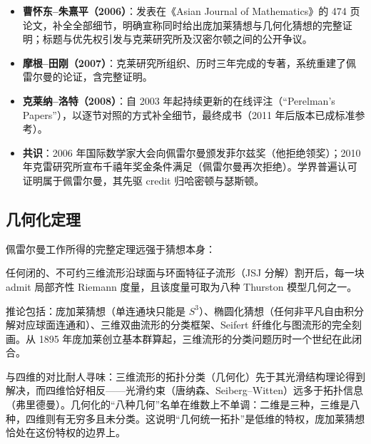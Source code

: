 \begin{itemize}
    \item \textbf{曹怀东--朱熹平（2006）}\cite{cao2006}：发表在《Asian Journal of Mathematics》的 474 页论文，补全全部细节，明确宣称同时给出庞加莱猜想与几何化猜想的完整证明；标题与优先权引发与克莱研究所及汉密尔顿之间的公开争议。
    \item \textbf{摩根--田刚（2007）}\cite{morgan2007}：克莱研究所组织、历时三年完成的专著，系统重建了佩雷尔曼的论证，含完整证明。
    \item \textbf{克莱纳--洛特（2008）}\cite{kleiner2008}：自 2003 年起持续更新的在线评注（“Perelman's Papers”），以逐节对照的方式补全细节，最终成书（2011 年后版本已成标准参考）。
    \item \textbf{共识}：2006 年国际数学家大会向佩雷尔曼颁发菲尔兹奖（他拒绝领奖）；2010 年克雷研究所宣布千禧年奖金条件满足（佩雷尔曼再次拒绝）。学界普遍认可证明属于佩雷尔曼，其先驱 credit 归哈密顿与瑟斯顿。
\end{itemize}

\subsection{几何化定理}

佩雷尔曼工作所得的完整定理远强于猜想本身：

\begin{theorem}[三维几何化定理]\label{thm:geometrization}
    任何闭的、不可约三维流形沿球面与环面特征子流形（JSJ 分解）割开后，每一块 admit 局部齐性 Riemann 度量，且该度量可取为八种 Thurston 模型几何之一。
\end{theorem}

推论包括：庞加莱猜想（单连通块只能是 $S^3$）、椭圆化猜想（任何非平凡自由积分解对应球面连通和）、三维双曲流形的分类框架、Seifert 纤维化与图流形的完全刻画。从 1895 年庞加莱创立基本群算起，三维流形的分类问题历时一个世纪在此闭合。

\begin{remark}
    与四维的对比耐人寻味：三维流形的拓扑分类（几何化）先于其光滑结构理论得到解决，而四维恰好相反——光滑约束（唐纳森、Seiberg--Witten）远多于拓扑信息（弗里德曼）。几何化的“八种几何”名单在维数上不单调：二维是三种，三维是八种，四维则有无穷多且未分类。这说明“几何统一拓扑”是低维的特权，庞加莱猜想恰处在这份特权的边界上。
\end{remark}
